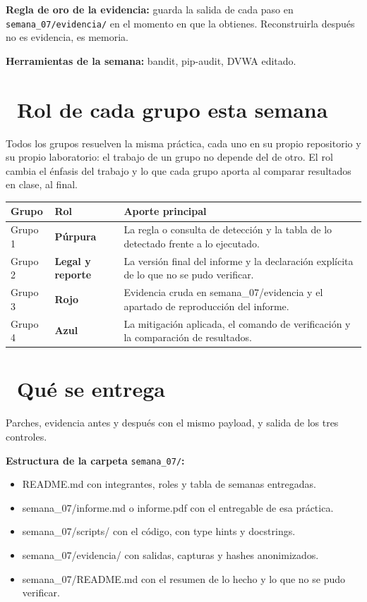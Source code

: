 \documentclass[11pt,a4paper]{article}
\newcommand{\iconotexto}[2]{\textcolor{cyanNeon}{\faIcon{#1}}~#2}
\begin{document}
\begin{cajaConcepto}\textbf{Regla de oro de la evidencia:} guarda la salida de cada paso en \texttt{semana\_07/evidencia/} en el momento en que la obtienes. Reconstruirla después no es evidencia, es memoria.
\end{cajaConcepto}

\textbf{Herramientas de la semana:} bandit, pip-audit, DVWA editado.

\section{\iconotexto{users}{Rol de cada grupo esta semana}}

Todos los grupos resuelven la misma práctica, cada uno en su propio repositorio y su propio laboratorio: el trabajo de un grupo no depende del de otro. El rol cambia el énfasis del trabajo y lo que cada grupo aporta al comparar resultados en clase, al final.

\begin{tabularx}{\linewidth}{@{}l l X@{}}
\toprule
Grupo & Rol & Aporte principal\\
\midrule
Grupo 1 & \textbf{Púrpura} & La regla o consulta de detección y la tabla de lo detectado frente a lo ejecutado. \\
Grupo 2 & \textbf{Legal y reporte} & La versión final del informe y la declaración explícita de lo que no se pudo verificar. \\
Grupo 3 & \textbf{Rojo} & Evidencia cruda en semana\_07/evidencia y el apartado de reproducción del informe. \\
Grupo 4 & \textbf{Azul} & La mitigación aplicada, el comando de verificación y la comparación de resultados. \\
\bottomrule
\end{tabularx}

\section{\iconotexto{box-open}{Qué se entrega}}

Parches, evidencia antes y después con el mismo payload, y salida de los tres controles.

\textbf{Estructura de la carpeta} \texttt{semana\_07/}\textbf{:}

\begin{itemize}[leftmargin=1.4em,itemsep=2pt,topsep=3pt]
  \item README.md con integrantes, roles y tabla de semanas entregadas.
  \item semana\_07/informe.md o informe.pdf con el entregable de esa práctica.
  \item semana\_07/scripts/ con el código, con type hints y docstrings.
  \item semana\_07/evidencia/ con salidas, capturas y hashes anonimizados.
  \item semana\_07/README.md con el resumen de lo hecho y lo que no se pudo verificar.
\end{itemize}
\end{document}
